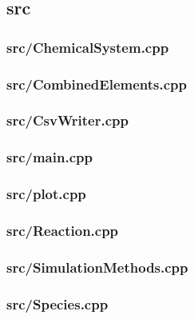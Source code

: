 \subsection{src}
\subsubsection{src/ChemicalSystem.cpp}

\newpage
\subsubsection{src/CombinedElements.cpp}

\newpage
\subsubsection{src/CsvWriter.cpp}

\newpage
\subsubsection{src/main.cpp}

\newpage
\subsubsection{src/plot.cpp}

\newpage
\subsubsection{src/Reaction.cpp} \label{subsec:reaction}

\newpage
\subsubsection{src/SimulationMethods.cpp}

\newpage
\subsubsection{src/Species.cpp}

\newpage
